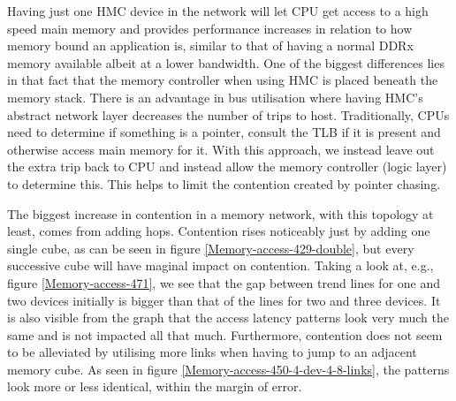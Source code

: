 Having just one HMC device in the network will let CPU get access to a high speed main memory and provides performance increases in relation to how memory bound an application is, similar to that of having a normal DDRx memory available albeit at a lower bandwidth. One of the biggest differences lies in that fact that the memory controller when using HMC is placed beneath the memory stack. There is an advantage in bus utilisation where having HMC's abstract network layer decreases the number of trips to host. Traditionally, CPUs need to determine if something is a pointer, consult the TLB if it is present and otherwise access main memory for it. With this approach, we instead leave out the extra trip back to CPU and instead allow the memory controller (logic layer) to determine this. This helps to limit the contention created by pointer chasing.
\bigskip

The biggest increase in contention in a memory network, with this topology at least, comes from adding hops. Contention rises noticeably just by adding one single cube, as can be seen in figure \ref{Memory-access-429-double}, but every successive cube will have maginal impact on contention. Taking a look at, e.g., figure \ref{Memory-access-471}, we see that the gap between trend lines for one and two devices initially is bigger than that of the lines for two and three devices. It is also visible from the graph that the access latency patterns look very much the same and is not impacted all that much. Furthermore, contention does not seem to be alleviated by utilising more links when having to jump to an adjacent memory cube. As seen in figure \ref{Memory-access-450-4-dev-4-8-links}, the patterns look more or less identical, within the margin of error. 